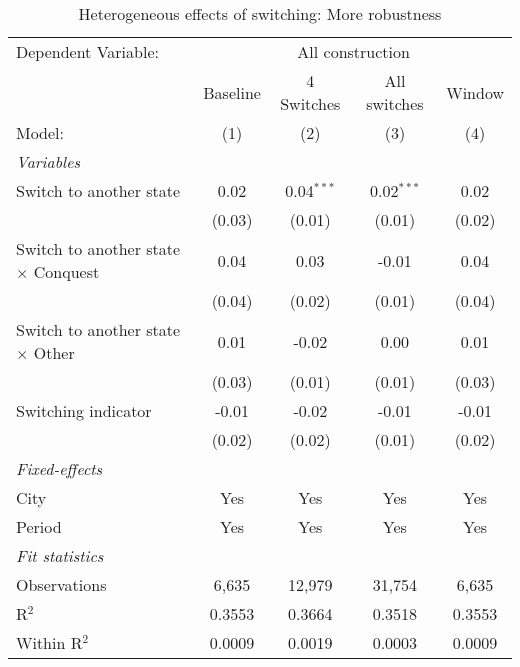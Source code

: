 \begin{table}[htbp]
   \caption{\label{tab:robustness_50y} Heterogeneous effects of switching: More robustness}
   \centering
   \begin{tabular}{lcccc}
      \tabularnewline \midrule \midrule
      Dependent Variable: & \multicolumn{4}{c}{All construction}\\
                                                 & Baseline & 4 Switches   & All switches & Window \\   
      Model:                                     & (1)      & (2)          & (3)          & (4)\\  
      \midrule
      \emph{Variables}\\
      Switch to another state                    & 0.02     & 0.04$^{***}$ & 0.02$^{***}$ & 0.02\\   
                                                 & (0.03)   & (0.01)       & (0.01)       & (0.02)\\   
      Switch to another state $\times$ Conquest  & 0.04     & 0.03         & -0.01        & 0.04\\   
                                                 & (0.04)   & (0.02)       & (0.01)       & (0.04)\\   
      Switch to another state $\times$ Other     & 0.01     & -0.02        & 0.00         & 0.01\\   
                                                 & (0.03)   & (0.01)       & (0.01)       & (0.03)\\   
      Switching indicator                        & -0.01    & -0.02        & -0.01        & -0.01\\   
                                                 & (0.02)   & (0.02)       & (0.01)       & (0.02)\\   
      \midrule
      \emph{Fixed-effects}\\
      City                                       & Yes      & Yes          & Yes          & Yes\\  
      Period                                     & Yes      & Yes          & Yes          & Yes\\  
      \midrule
      \emph{Fit statistics}\\
      Observations                               & 6,635    & 12,979       & 31,754       & 6,635\\  
      R$^2$                                      & 0.3553   & 0.3664       & 0.3518       & 0.3553\\  
      Within R$^2$                               & 0.0009   & 0.0019       & 0.0003       & 0.0009\\  
      \midrule \midrule
      

\end{tabular}
\end{table}
